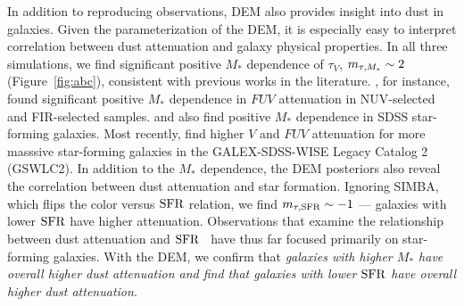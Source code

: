 In addition to reproducing observations, DEM also provides insight into dust in
galaxies. Given the parameterization of the DEM, it is especially easy to
interpret correlation between dust attenuation and galaxy physical properties.
In all three simulations, we find significant positive $M_*$ dependence of
$\tau_V$, $m_{\tau,M_*} \sim 2$ (Figure~\ref{fig:abc}), consistent with previous
works in the literature. \cite{burgarella2005}, for instance, found significant
positive $M_*$ dependence in $FUV$ attenuation in NUV-selected and FIR-selected
samples. \cite{garn2010} and \cite{battisti2016} also find positive $M_*$ 
dependence in SDSS star-forming galaxies. Most recently, \cite{salim2018} 
find higher $V$ and $FUV$ attenuation for more masssive star-forming galaxies in the
GALEX-SDSS-WISE Legacy Catalog 2 (GSWLC2). 
In addition to the $M_*$ dependence, the DEM posteriors also reveal the
correlation between dust attenuation and star formation. Ignoring SIMBA, which
flips the color versus ${\rm SFR}$ relation, we find $m_{\tau,{\rm SFR}}\sim-1$ --- galaxies 
with lower ${\rm SFR}$ have higher attenuation. Observations that examine the
relationship between dust attenuation and ${\rm SFR}$~\citep[\eg][]{garn2010,
reddy2015, battisti2016, battisti2017, salim2018} have thus far focused
primarily on star-forming galaxies. With the DEM, we confirm that 
\emph{galaxies with higher $M_*$ have overall higher dust attenuation
and find that galaxies with lower ${\rm SFR}$ have overall higher dust attenuation}. 



